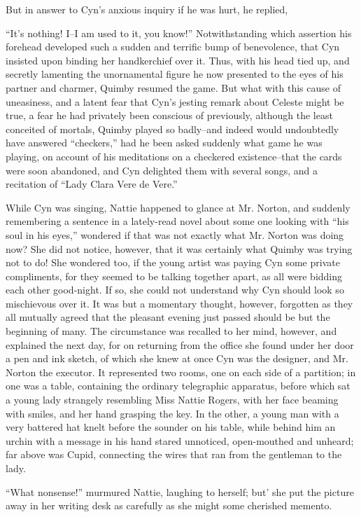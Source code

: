 But in answer to Cyn's anxious inquiry if he was hurt, he replied,

``It's nothing! I--I am used to it, you know!'' Notwithstanding which
assertion his forehead developed such a sudden and terrific bump of
benevolence, that Cyn insisted upon binding her handkerchief over it.
Thus, with his head tied up, and secretly lamenting the unornamental
figure he now presented to the eyes of his partner and charmer, Quimby
resumed the game. But what with this cause of uneasiness, and a latent
fear that Cyn's jesting remark about Celeste might be true, a fear he
had privately been conscious of previously, although the least conceited
of mortals, Quimby played so badly--and indeed would undoubtedly have
answered ``checkers,'' had he been asked suddenly what game he was
playing, on account of his meditations on a checkered existence--that
the cards were soon abandoned, and Cyn delighted them with several
songs, and a recitation of ``Lady Clara Vere de Vere.''

While Cyn was singing, Nattie happened to glance at Mr. Norton, and
suddenly remembering a sentence in a lately-read novel about some one
looking with ``his soul in his eyes,'' wondered if that was not exactly
what Mr. Norton was doing now? She did not notice, however, that it was
certainly what Quimby was trying not to do! She wondered too, if the
young artist was paying Cyn some private compliments, for they seemed to
be talking together apart, as all were bidding each other good-night. If
so, she could not understand why Cyn should look so mischievous over it.
It was but a momentary thought, however, forgotten as they all mutually
agreed that the pleasant evening just passed should be but the beginning
of many. The circumstance was recalled to her mind, however, and
explained the next day, for on returning from the office she found under
her door a pen and ink sketch, of which she knew at once Cyn was the
designer, and Mr. Norton the executor. It represented two rooms, one on
each side of a partition; in one was a table, containing the ordinary
telegraphic apparatus, before which sat a young lady strangely
resembling Miss Nattie Rogers, with her face beaming with smiles, and
her hand grasping the key. In the other, a young man with a very
battered hat knelt before the sounder on his table, while behind him an
urchin with a message in his hand stared unnoticed, open-mouthed and
unheard; far above was Cupid, connecting the wires that ran from the
gentleman to the lady.

``What nonsense!'' murmured Nattie, laughing to herself; but' she put the
picture away in her writing desk as carefully as she might some
cherished memento.






